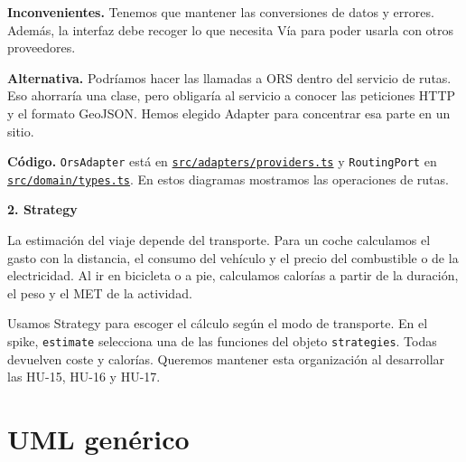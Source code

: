 \documentclass[10pt,a4paper]{article}
\newcommand{\titulo}[2]{{\LARGE\bfseries #1. #2}\par}
\newcommand{\apartado}[1]{\section*{\large #1}}
\newcommand{\fuente}[2]{\href{https://github.com/Kiliansito/ei1039-ei1048-movilidad/blob/dce2b57/entrega1/02_Spike/#1}{\texttt{\small #2}}}
\begin{document}
\textbf{Inconvenientes.} Tenemos que mantener las conversiones de datos y errores. Además, la interfaz debe recoger lo que necesita Vía para poder usarla con otros proveedores.

\textbf{Alternativa.} Podríamos hacer las llamadas a ORS dentro del servicio de rutas. Eso ahorraría una clase, pero obligaría al servicio a conocer las peticiones HTTP y el formato GeoJSON. Hemos elegido Adapter para concentrar esa parte en un sitio.

\textbf{Código.} \texttt{OrsAdapter} está en \fuente{src/adapters/providers.ts}{src/adapters/providers.ts} y \texttt{RoutingPort} en \fuente{src/domain/types.ts}{src/domain/types.ts}. En estos diagramas mostramos las operaciones de rutas.

\newpage
\titulo{2}{Strategy}
La estimación del viaje depende del transporte. Para un coche calculamos el gasto con la distancia, el consumo del vehículo y el precio del combustible o de la electricidad. Al ir en bicicleta o a pie, calculamos calorías a partir de la duración, el peso y el MET de la actividad.

Usamos Strategy para escoger el cálculo según el modo de transporte. En el spike, \texttt{estimate} selecciona una de las funciones del objeto \texttt{strategies}. Todas devuelven coste y calorías. Queremos mantener esta organización al desarrollar las HU-15, HU-16 y HU-17.

\apartado{UML genérico}
\begin{center}\end{center}
\end{document}
